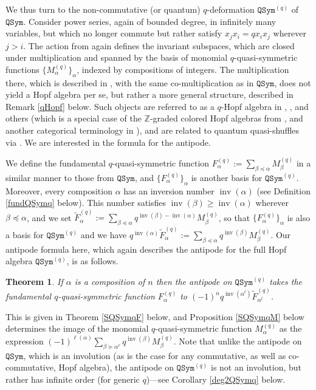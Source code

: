 \documentclass{article}
\newtheorem*{thmnn}{Theorem}
\theoremstyle{definition}
\begin{document}
We thus turn to the non-commutative (or quantum) $q$-deformation $\mathtt{QSym}^{(q)}$ of $\mathtt{QSym}$. Consider power series, again of bounded degree, in infinitely many variables, but which no longer commute but rather satisfy $x_{j}x_{i}=qx_{i}x_{j}$ wherever $j>i$. The action from \cite{[Hi2]} again defines the invariant subspaces, which are closed under multiplication and spanned by the basis of monomial $q$-quasi-symmetric functions $\{M_{\alpha}^{(q)}\}_{\alpha}$, indexed by compositions of integers. The multiplication there, which is described in \cite{[TU]}, with the same co-multiplication as in $\mathtt{QSym}$, does not yield a Hopf algebra per se, but rather a more general structure, described in Remark \ref{qHopf} below. Such objects are referred to as a $q$-Hopf algebra in \cite{[EK]}, \cite{[L]}, and others (which is a special case of the $\mathbb{Z}$-graded colored Hopf algebras from \cite{[Mo]}, and another categorical terminology in \cite{[AgM]}), and are related to quantum quasi-shuffles via \cite{[JRZ]}. We are interested in the formula for the antipode.

We define the fundamental $q$-quasi-symmetric function $F_{\alpha}^{(q)}:=\sum_{\beta\preceq\alpha}M_{\beta}^{(q)}$ in a similar manner to those from $\mathtt{QSym}$, and $\{F_{\alpha}^{(q)}\}_{\alpha}$ is another basis for $\mathtt{QSym}^{(q)}$. Moreover, every composition $\alpha$ has an inversion number $\operatorname{inv}(\alpha)$ (see Definition \ref{fundQSymq}  below). This number satisfies $\operatorname{inv}(\beta)\geq\operatorname{inv}(\alpha)$ wherever $\beta\preceq\alpha$, and we set $\widetilde{F}_{\alpha}^{(q)}:=\sum_{\beta\preceq\alpha}q^{\operatorname{inv}(\beta)-\operatorname{inv}(\alpha)}M_{\beta}^{(q)}$, so that $\{F_{\alpha}^{(q)}\}_{\alpha}$ is also a basis for $\mathtt{QSym}^{(q)}$ and we have $q^{\operatorname{inv}(\alpha)}\widetilde{F}_{\alpha}^{(q)}:=\sum_{\beta\preceq\alpha}q^{\operatorname{inv}(\beta)}M_{\beta}^{(q)}$. Our antipode formula here, which again describes the antipode for the full Hopf algebra $\mathtt{QSym}^{(q)}$, is as follows.
\begin{thmnn}
If $\alpha$ is a composition of $n$ then the antipode on $\mathtt{QSym}^{(q)}$ takes the fundamental $q$-quasi-symmetric function $F_{\alpha}^{(q)}$ to $(-1)^{n}q^{\operatorname{inv}(\alpha^{t})}\widetilde{F}_{\alpha^{t}}^{(q)}$.
\end{thmnn}
This is given in Theorem \ref{SQSymqF} below, and Proposition \ref{SQSymqM} below determines the image of the monomial $q$-quasi-symmetric function $M_{\alpha}^{(q)}$ as the expression $(-1)^{\ell(\alpha)}\sum_{\beta\succeq\alpha^{r}}q^{\operatorname{inv}(\beta)}M_{\beta}^{(q)}$. Note that unlike the antipode on $\mathtt{QSym}$, which is an involution (as is the case for any commutative, as well as co-commutative, Hopf algebra), the antipode on $\mathtt{QSym}^{(q)}$ is not an involution, but rather has infinite order (for generic $q$)---see Corollary \ref{deg2QSymq} below.
\end{document}
